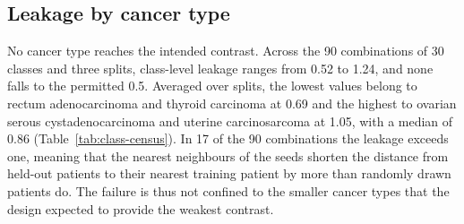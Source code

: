 \subsection{Leakage by cancer type}
\label{sec:census-classes}
No cancer type reaches the intended contrast. Across the 90 combinations of 30 classes and three splits, class-level leakage ranges from 0.52 to 1.24, and none falls to the permitted 0.5. Averaged over splits, the lowest values belong to rectum adenocarcinoma and thyroid carcinoma at 0.69 and the highest to ovarian serous cystadenocarcinoma and uterine carcinosarcoma at 1.05, with a median of 0.86 (Table~\ref{tab:class-census}). In 17 of the 90 combinations the leakage exceeds one, meaning that the nearest neighbours of the seeds shorten the distance from held-out patients to their nearest training patient by more than randomly drawn patients do. The failure is thus not confined to the smaller cancer types that the design expected to provide the weakest contrast.

